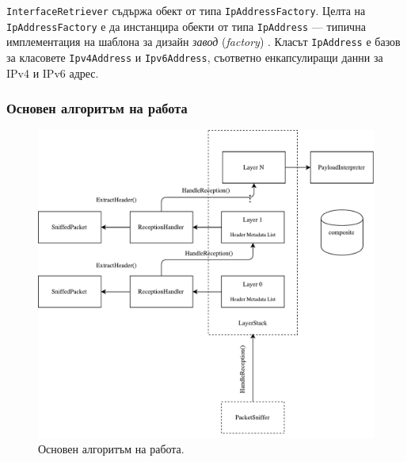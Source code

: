 \documentclass[12pt,a4paper,oneside]{book}
\begin{document}
\texttt{InterfaceRetriever} съдържа обект от типа
\texttt{IpAddressFactory}. Целта на \texttt{IpAddressFactory} е да инстанцира
обекти от типа \texttt{IpAddress} --- типична
имплементация на шаблона за дизайн \textit{завод} (\textit{factory}) \cite{gamma_design_1995}.
Класът \texttt{IpAddress} е базов за класовете \texttt{Ipv4Address} и
\texttt{Ipv6Address}, съответно енкапсулиращи данни за IPv4 и IPv6 адрес.

\subsubsection{Основен алгоритъм на работа}

\begin{figure}[h!]
  \centering
  \includegraphics[scale=.7]{figures/main_algorithm.pdf}
  \caption{Основен алгоритъм на работа.}
  \label{main_algorithm_fig}
\end{figure}
\end{document}
